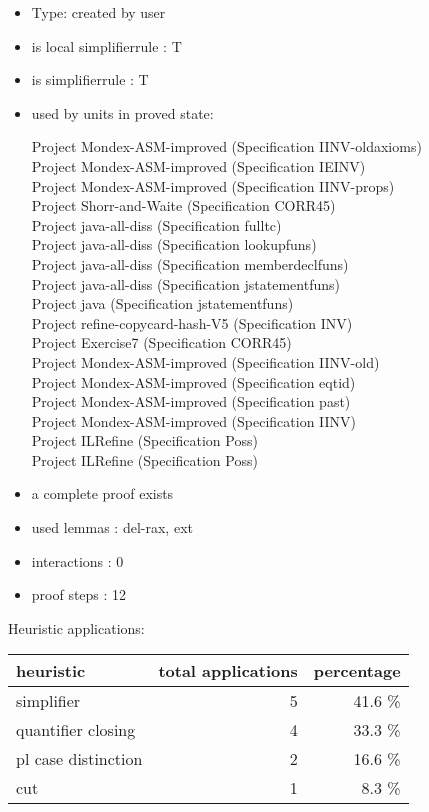 \documentclass[a4paper]{article}
\begin{document}
\begin{itemize}

\item Type: created by user

\item is local simplifierrule : T
\item is simplifierrule : T
\item used by units in proved state:

Project Mondex-ASM-improved (Specification IINV-oldaxioms) \\
Project Mondex-ASM-improved (Specification IEINV) \\
Project Mondex-ASM-improved (Specification IINV-props) \\
Project Shorr-and-Waite (Specification CORR45) \\
Project java-all-diss (Specification fulltc) \\
Project java-all-diss (Specification lookupfuns) \\
Project java-all-diss (Specification memberdeclfuns) \\
Project java-all-diss (Specification jstatementfuns) \\
Project java (Specification jstatementfuns) \\
Project refine-copycard-hash-V5 (Specification INV) \\
Project Exercise7 (Specification CORR45) \\
Project Mondex-ASM-improved (Specification IINV-old) \\
Project Mondex-ASM-improved (Specification eqtid) \\
Project Mondex-ASM-improved (Specification past) \\
Project Mondex-ASM-improved (Specification IINV) \\
Project ILRefine (Specification Poss) \\
Project ILRefine (Specification Poss)
\item       a complete proof exists
\item       used lemmas  : del-rax, ext
\item       interactions : 0
\item       proof steps  : 12
\end{itemize}

\medskip


Heuristic applications:

\begin{supertabular}{l|r|r}
heuristic	& total applications & percentage \\ \hline
simplifier & 5 & 41.6 \% \\
quantifier closing & 4 & 33.3 \% \\
pl case distinction & 2 & 16.6 \% \\
cut & 1 & 8.3 \% \\

\end{supertabular}
\end{document}
